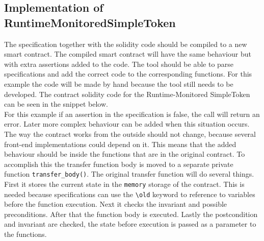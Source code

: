 \documentclass[a4paper]{article}
\begin{document}
\subsection{Implementation of RuntimeMonitoredSimpleToken}
The specification together with the solidity code should be compiled to a new smart contract. The compiled smart contract will have the same behaviour but with extra assertions added to the code. The tool should be able to parse specifications and add the correct code to the corresponding functions. For this example the code will be made by hand because the tool still needs to be developed. The contract solidity code for the Runtime-Monitored SimpleToken can be seen in the snippet below.\\
For this example if an assertion in the specification is false, the call will return an error. Later more complex behaviour can be added when this situation occurs. The way the contract works from the outside should not change, because several front-end implementations could depend on it. This means that the added behaviour should be inside the functions that are in the original contract. To accomplish this the transfer function body is moved to a separate private function \texttt{transfer\_body()}. The original transfer function will do several things. First it stores the current state in the \texttt{memory} storage of the contract. This is needed because specifications can use the \texttt{\textbackslash old} keyword to reference to variables before the function execution. Next it checks the invariant and possible preconditions. After that the function body is executed. Lastly the postcondition and invariant are checked, the state before execution is passed as a parameter to the functions. 


\end{document}
